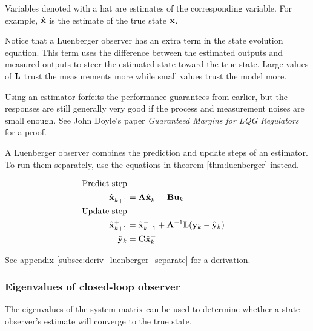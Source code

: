 Variables denoted with a hat are estimates of the corresponding variable. For
example, $\hat{\mathbf{x}}$ is the estimate of the true \gls{state} $\mathbf{x}$.

Notice that a Luenberger \gls{observer} has an extra term in the \gls{state}
evolution equation. This term uses the difference between the estimated
\glspl{output} and measured \glspl{output} to steer the estimated \gls{state}
toward the true \gls{state}. Large values of $\mathbf{L}$ trust the measurements
more while small values trust the \gls{model} more.
\begin{remark}
  Using an estimator forfeits the performance guarantees from earlier, but the
  responses are still generally very good if the process and measurement noises
  are small enough. See John Doyle's paper \textit{Guaranteed Margins for LQG
  Regulators} for a proof.
\end{remark}

A Luenberger \gls{observer} combines the prediction and update steps of an
estimator. To run them separately, use the equations in theorem
\ref{thm:luenberger} instead.
\begin{theorem}
  \label{thm:luenberger}
  \begin{align}
    \text{Predict step} \nonumber \\
    \hat{\mathbf{x}}_{k+1}^- &= \mathbf{A}\hat{\mathbf{x}}_k^- + \mathbf{B}\mathbf{u}_k \\
    \text{Update step} \nonumber \\
    \hat{\mathbf{x}}_{k+1}^+ &= \hat{\mathbf{x}}_{k+1}^- + \mathbf{A}^{-1}\mathbf{L}
      (\mathbf{y}_k - \hat{\mathbf{y}}_k) \\
    \hat{\mathbf{y}}_k &= \mathbf{C} \hat{\mathbf{x}}_k^-
  \end{align}
\end{theorem}

See appendix \ref{subsec:deriv_luenberger_separate} for a derivation.

\subsubsection{Eigenvalues of closed-loop observer}

The eigenvalues of the system matrix can be used to determine whether a
\gls{state} \gls{observer}'s estimate will converge to the true \gls{state}.

